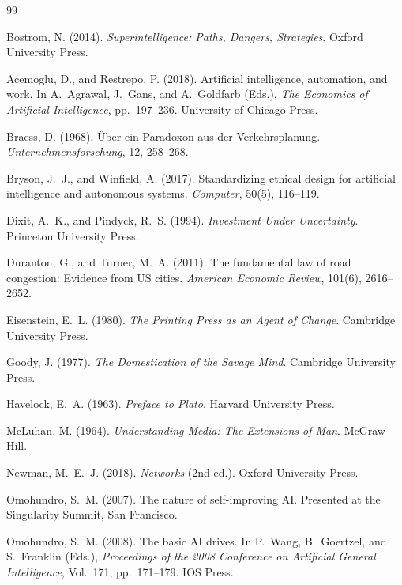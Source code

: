 \documentclass[12pt, oneside]{book}
\theoremstyle{plain}
\theoremstyle{definition}
\theoremstyle{remark}
\theoremstyle{definition}
\begin{document}
\backmatter

\begin{thebibliography}{99}

Bostrom, N. (2014). \textit{Superintelligence: Paths, Dangers, Strategies}.
Oxford University Press.

Acemoglu, D., and Restrepo, P. (2018). Artificial intelligence, automation, and
work. In A.\ Agrawal, J.\ Gans, and A.\ Goldfarb (Eds.),
\textit{The Economics of Artificial Intelligence}, pp.\ 197--236. University of
Chicago Press.

Braess, D. (1968). Über ein Paradoxon aus der Verkehrsplanung.
\textit{Unternehmensforschung}, 12, 258--268.

Bryson, J.\ J., and Winfield, A. (2017). Standardizing ethical design for
artificial intelligence and autonomous systems. \textit{Computer}, 50(5), 116--119.

Dixit, A.\ K., and Pindyck, R.\ S. (1994). \textit{Investment Under Uncertainty}.
Princeton University Press.

Duranton, G., and Turner, M.\ A. (2011). The fundamental law of road congestion:
Evidence from US cities. \textit{American Economic Review}, 101(6), 2616--2652.

Eisenstein, E.\ L. (1980). \textit{The Printing Press as an Agent of Change}.
Cambridge University Press.

Goody, J. (1977). \textit{The Domestication of the Savage Mind}. Cambridge
University Press.

Havelock, E.\ A. (1963). \textit{Preface to Plato}. Harvard University Press.

McLuhan, M. (1964). \textit{Understanding Media: The Extensions of Man}.
McGraw-Hill.

Newman, M.\ E.\ J. (2018). \textit{Networks} (2nd ed.). Oxford University Press.

Omohundro, S.\ M. (2007). The nature of self-improving AI. Presented at the
Singularity Summit, San Francisco.

Omohundro, S.\ M. (2008). The basic AI drives. In P.\ Wang, B.\ Goertzel, and
S.\ Franklin (Eds.), \textit{Proceedings of the 2008 Conference on Artificial
General Intelligence}, Vol.\ 171, pp.\ 171--179. IOS Press.


\end{thebibliography}
\end{document}
